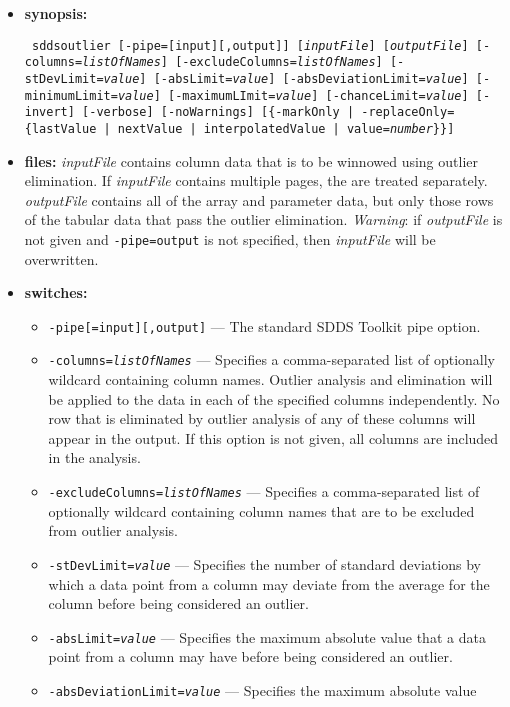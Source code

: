 \begin{itemize}
\item {\bf synopsis:} 
\begin{flushleft}{\tt
sddsoutlier [-pipe=[input][,output]] [{\em inputFile}] [{\em outputFile}]
[-columns={\em listOfNames}] [-excludeColumns={\em listOfNames}]
[-stDevLimit={\em value}] [-absLimit={\em value}] [-absDeviationLimit={\em value}]
[-minimumLimit={\em value}] [-maximumLImit={\em value}] 
[-chanceLimit={\em value}] [-invert] [-verbose] [-noWarnings] 
[\{-markOnly | -replaceOnly=\{lastValue | nextValue | interpolatedValue | value={\em number}\}\}]
}\end{flushleft}
\item {\bf files:}
{\em inputFile} contains column data that is to be winnowed using outlier elimination.
If {\em inputFile} contains multiple pages, the are treated separately.  {\em
outputFile} contains all of the array and parameter data, but only those rows of the
tabular data that pass the outlier elimination.  {\em Warning}: if {\em outputFile} is
not given and {\tt -pipe=output} is not specified, then {\em inputFile} will be
overwritten.
\item {\bf switches:}
    \begin{itemize}
    \item {\tt -pipe[=input][,output]} --- The standard SDDS Toolkit pipe option.
    \item {\tt -columns={\em listOfNames}} --- Specifies a comma-separated list of
        optionally wildcard containing column names.  Outlier analysis and elimination
        will be applied to the data in each of the specified columns independently.
        No row that is eliminated by outlier analysis of any of these columns will      
        appear in the output.  If this option is not given, all columns are 
        included in the analysis.
    \item {\tt -excludeColumns={\em listOfNames}} --- Specifies a comma-separated list of
        optionally wildcard containing column names that are to be excluded from 
        outlier analysis.
    \item {\tt -stDevLimit={\em value}} --- Specifies the number of standard deviations
        by which a data point from a column may deviate from the average for the column
        before being considered an outlier.
    \item {\tt -absLimit={\em value}} --- Specifies the maximum absolute value that
        a data point from a column may have before being considered an outlier.
    \item {\tt -absDeviationLimit={\em value}} --- Specifies the maximum absolute value

\end{itemize}
\end{itemize}
